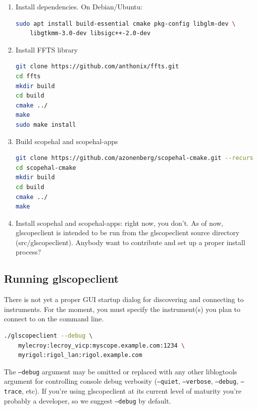 \documentclass[11pt]{article}
\begin{document}
\begin{enumerate}

\item Install dependencies. On Debian/Ubuntu:
\begin{lstlisting}[language=sh]
sudo apt install build-essential cmake pkg-config libglm-dev \
	libgtkmm-3.0-dev libsigc++-2.0-dev
\end{lstlisting}

\item Install FFTS library
\begin{lstlisting}[language=sh]
git clone https://github.com/anthonix/ffts.git
cd ffts
mkdir build
cd build
cmake ../
make
sudo make install
\end{lstlisting}

\item Build scopehal and scopehal-apps
\begin{lstlisting}[language=sh]
git clone https://github.com/azonenberg/scopehal-cmake.git --recurse-submodules
cd scopehal-cmake
mkdir build
cd build
cmake ../
make
\end{lstlisting}

\item Install scopehal and scopehal-apps: right now, you don't. As of now, glscopeclient is intended to be run from the
glscopeclient source directory (src/glscopeclient). Anybody want to contribute and set up a proper install process?

\end{enumerate}

\subsection{Running glscopeclient}

There is not yet a proper GUI startup dialog for discovering and connecting to instruments. For the moment, you must
specify the instrument(s) you plan to connect to on the command line.

\begin{lstlisting}[language=sh]
./glscopeclient --debug \
	mylecroy:lecroy_vicp:myscope.example.com:1234 \
	myrigol:rigol_lan:rigol.example.com
\end{lstlisting}

The \texttt{--debug} argument may be omitted or replaced with any other liblogtools argument for controlling console
debug verbosity (\texttt{--quiet}, \texttt{--verbose}, \texttt{--debug}, \texttt{--trace}, etc). If you're using
glscopeclient at its current level of maturity you're probably a developer, so we suggest \texttt{--debug} by default.
\end{document}
